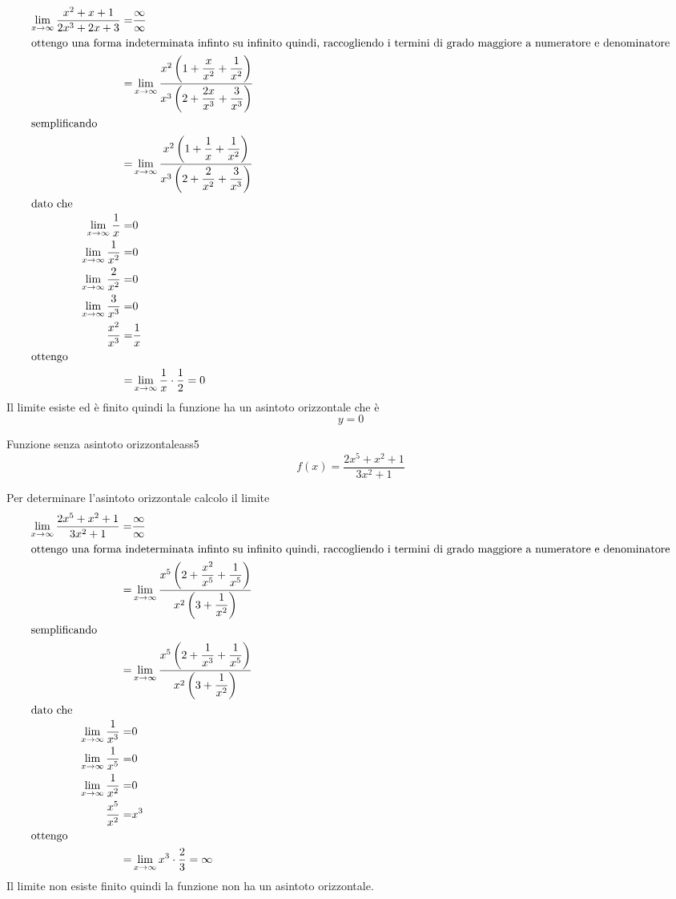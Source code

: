 \begin{align*}\index{Forma!indeterminata!infinito su infinito}
\lim_{x\to \infty}\dfrac{x^2+x+1}{2x^3+2x+3}=&\dfrac{\infty}{\infty}\\
\intertext{ottengo una forma indeterminata infinto su infinito quindi, raccogliendo i termini di grado maggiore a numeratore e denominatore}
=&\lim_{x\to \infty}\dfrac{x^2\left(1+\dfrac{x}{x^2}+\dfrac{1}{x^2}\right)}{x^3\left(2+\dfrac{2x}{x^3}+\dfrac{3}{x^3}\right)}\\
\intertext{semplificando}
=&\lim_{x\to \infty}\dfrac{x^2\left(1+\dfrac{1}{x}+\dfrac{1}{x^2}\right)}{x^3\left(2+\dfrac{2}{x^2}+\dfrac{3}{x^3}\right)}\\
\intertext{dato che}
\lim_{x\to \infty}\dfrac{1}{x}=&0\\
\lim_{x\to \infty}\dfrac{1}{x^2}=&0\\
\lim_{x\to \infty}\dfrac{2}{x^2}=&0\\
\lim_{x\to \infty}\dfrac{3}{x^3}=&0\\
\dfrac{x^2}{x^3}=&\dfrac{1}{x}\\
\intertext{ottengo}
=&\lim_{x\to \infty}\dfrac{1}{x}\cdot\dfrac{1}{2}=0\\
\end{align*}
Il limite esiste ed è finito quindi la funzione ha un asintoto orizzontale che è \[y=0\]
\begin{cesempiot}{Funzione senza asintoto orizzontale}{ass5}
	\[f(x)=\dfrac{2x^5+x^2+1}{3x^2+1}\]
\end{cesempiot}
Per determinare l'asintoto orizzontale calcolo il limite 
\begin{align*}\index{Forma!indeterminata!infinito su infinito}
\lim_{x\to \infty}\dfrac{2x^5+x^2+1}{3x^2+1}=&\dfrac{\infty}{\infty}\\
\intertext{ottengo una forma indeterminata infinto su infinito quindi, raccogliendo i termini di grado maggiore a numeratore e denominatore}
=&\lim_{x\to \infty}\dfrac{x^5\left(2+\dfrac{x^2}{x^5}+\dfrac{1}{x^5}\right)}{x^2\left(3+\dfrac{1}{x^2}\right)}\\
\intertext{semplificando}
=&\lim_{x\to \infty}\dfrac{x^5\left(2+\dfrac{1}{x^3}+\dfrac{1}{x^5}\right)}{x^2\left(3+\dfrac{1}{x^2}\right)}\\
\intertext{dato che}
\lim_{x\to \infty}\dfrac{1}{x^3}=&0\\
\lim_{x\to \infty}\dfrac{1}{x^5}=&0\\
\lim_{x\to \infty}\dfrac{1}{x^2}=&0\\
\dfrac{x^5}{x^2}=&x^3\\
\intertext{ottengo}
=&\lim_{x\to \infty}x^3\cdot\dfrac{2}{3}=\infty\\
\end{align*}
Il limite non esiste  finito quindi la funzione non ha un asintoto orizzontale.

